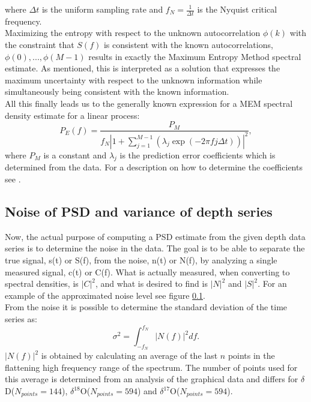 \documentclass[11pt]{article}
\begin{document}
where $\Delta t$ is the uniform sampling rate and $f_N = \frac{1}{\Delta t}$ is the Nyquist critical frequency.\\
Maximizing the entropy with respect to the unknown autocorrelation $\phi(k)$ with the constraint that $S(f)$ is consistent with the known autocorrelations, $\phi(0),...,\phi(M-1)$ results in exactly the Maximum Entropy Method spectral estimate. As mentioned, this is interpreted as a solution that expresses the maximum uncertainty with respect to the unknown information while simultaneously being consistent with the known information. \\
All this finally leads us to the generally known expression for a MEM spectral density estimate for a linear process:
\begin{equation}
	P_E(f) = \frac{P_M}{f_N|1 + \sum_{j = 1}^{M-1}(\lambda_j \exp(-2\pi f j \Delta t))|^2},
\end{equation}
where $P_M$ is a constant and $\lambda_j$ is the prediction error coefficients which is determined from the data. For a description on how to determine the coefficients see \cite{MEMcoeffs}. 

\subsection{Noise of PSD and variance of depth series}
Now, the actual purpose of computing a PSD estimate from the given depth data series is to determine the noise in the data. The goal is to be able to separate the true signal, s(t) or S(f), from the noise, n(t) or N(f), by analyzing a single measured signal, c(t) or C(f)\cite{NumRecFortran}. What is actually measured, when converting to spectral densities, is $|C|^2$, and what is desired to find is $|N|^2$ and $|S|^2$. For an example of the approximated noise level see figure \ref{}.\\

From the noise it is possible to determine the standard deviation of the time series as\cite{NumRecFortran}\cite{Holme}\cite{WaterIsoRatios}:
\begin{equation}
	\sigma^2 = \int_{-f_N}^{f_N}|N(f)|^2 df.
\end{equation} 
$|N(f)|^2$ is obtained by calculating an average of the last $n$ points in the flattening high frequency range of the spectrum. The number of points used for this average is determined from an analysis of the graphical data and differs for $\delta$D($N_{points} = 144$), $\delta ^{18}$O($N_{points} = 594$) and $\delta ^{17}$O($N_{points} = 594$).\\
\end{document}
